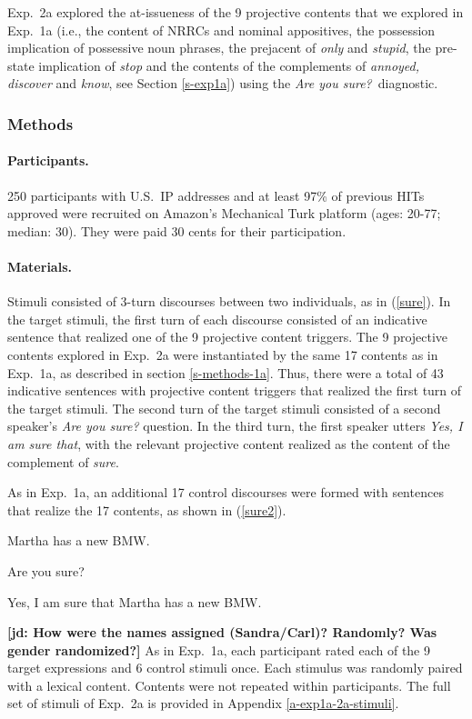 \documentclass[11pt,fleqn]{article}
\newcommand{\6}{\mbox{$[\hspace*{-.6mm}[$}}
\newcommand{\9}{\mbox{$]\hspace*{-.6mm}]$}}
\newcommand{\sectionref}[1]{Section \ref{#1}}
\newcommand{\jd}[1]{\textbf{\color{Green}[jd: #1]}}
\begin{document}
Exp.~2a explored the at-issueness of the 9 projective contents that we explored in Exp.~1a (i.e., the content of NRRCs and nominal appositives, the possession implication of possessive noun phrases, the prejacent of {\em only} and {\em stupid}, the pre-state implication of {\em stop} and the contents of the complements of {\em annoyed, discover} and {\em know}, see \sectionref{s-exp1a}) using the {\em Are you sure?}~diagnostic.

\subsubsection{Methods}\label{s-methods-2a}

\paragraph{Participants.} 250 participants with U.S.\ IP addresses and at least 97\% of previous HITs approved were recruited on Amazon's Mechanical Turk platform (ages: 20-77; median: 30). They were paid 30 cents for their participation.


\paragraph{Materials.} Stimuli consisted of 3-turn discourses between two individuals, as in (\ref{sure}). In the target stimuli, the first turn of each discourse consisted of an indicative sentence that realized one of the 9 projective content triggers. The 9 projective contents explored in Exp.~2a were instantiated by the same 17 contents as in Exp.~1a, as described in section \ref{s-methods-1a}. Thus, there were a total of 43 indicative sentences with projective content triggers that realized the first turn of the target stimuli. The second turn of the target stimuli consisted of a second speaker's {\em Are you sure?} question. In the third turn, the first speaker utters {\em Yes, I am sure that}, with the relevant projective content realized as the content of the complement of {\em sure}. 

As in Exp.~1a, an additional 17 control discourses were formed with sentences that realize the 17 contents, as shown in (\ref{sure2}).

\begin{exe}
\ex\label{sure2}
\begin{xlist}
 Martha has a new BMW.

 Are you sure?

 Yes, I am sure that Martha has a new BMW.
\end{xlist}
\end{exe}
\jd{How were the names assigned (Sandra/Carl)? Randomly? Was gender randomized?} As in Exp.~1a, each participant rated each of the 9 target expressions and 6 control stimuli once. Each stimulus was randomly paired with a lexical content. Contents were not repeated within participants. The full set of stimuli of Exp.~2a is provided in Appendix \ref{a-exp1a-2a-stimuli}.
\end{document}
